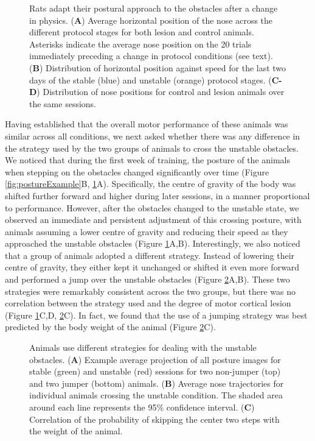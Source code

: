\begin{figure}
\centering

\caption{Rats adapt their postural approach to the obstacles after a change in physics. (\textbf{A}) Average horizontal position of the nose across the different protocol stages for both lesion and control animals. Asterisks indicate the average nose position on the 20 trials immediately preceding a change in protocol conditions (see text). (\textbf{B}) Distribution of horizontal position against speed for the last two days of the stable (blue) and unstable (orange) protocol stages. (\textbf{C-D}) Distribution of nose positions for control and lesion animals over the same sessions.}
\label{fig:posture}
\end{figure}

Having established that the overall motor performance of these animals was similar across all conditions, we next asked whether there was any difference in the strategy used by the two groups of animals to cross the unstable obstacles. We noticed that during the first week of training, the posture of the animals when stepping on the obstacles changed significantly over time (Figure \ref{fig:postureExample}B, \ref{fig:posture}A). Specifically, the centre of gravity of the body was shifted further forward and higher during later sessions, in a manner proportional to performance. However, after the obstacles changed to the unstable state, we observed an immediate and persistent adjustment of this crossing posture, with animals assuming a lower centre of gravity and reducing their speed as they approached the unstable obstacles (Figure \ref{fig:posture}A,B). Interestingly, we also noticed that a group of animals adopted a different strategy. Instead of lowering their centre of gravity, they either kept it unchanged or shifted it even more forward and performed a jump over the unstable obstacles (Figure \ref{fig:jumping}A,B). These two strategies were remarkably consistent across the two groups, but there was no correlation between the strategy used and the degree of motor cortical lesion (Figure \ref{fig:posture}C,D, \ref{fig:jumping}C). In fact, we found that the use of a jumping strategy was best predicted by the body weight of the animal (Figure \ref{fig:jumping}C).

\begin{figure}
\centering

\caption{Animals use different strategies for dealing with the unstable obstacles. (\textbf{A}) Example average projection of all posture images for stable (green) and unstable (red) sessions for two non-jumper (top) and two jumper (bottom) animals. (\textbf{B}) Average nose trajectories for individual animals crossing the unstable condition. The shaded area around each line represents the 95\% confidence interval. (\textbf{C}) Correlation of the probability of skipping the center two steps with the weight of the animal.}
\label{fig:jumping}
\end{figure}

